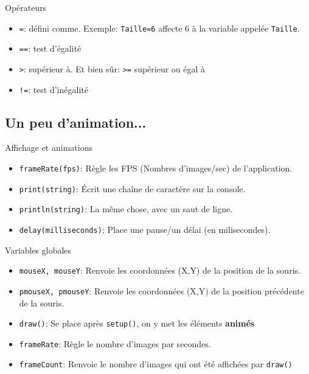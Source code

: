 \documentclass[a4paper, 8pt]{article}
\theoremstyle{definition}
\begin{document}


\begin{bclogo}[logo = \bccrayon, arrondi = 0.1, noborder = true]{\textcolor{redStruc}{Opérateurs}}
\begin{itemize}[font= \color{redStruc} \small , label = \textbullet ]
\item \texttt{=}: défini comme. Exemple: \texttt{Taille=6} affecte $6$ à la variable appelée \texttt{Taille}.
\item \texttt{==}: test d'égalité
\item  \texttt{>}: supérieur à. Et bien sûr: \texttt{>=} supérieur ou égal à
\item  \texttt{!=}: test d'inégalité
\end{itemize} 
\end{bclogo}




\subsection*{Un peu d'animation...}

\begin{bclogo}[logo = \bccrayon, arrondi = 0.1, noborder = true]{\textcolor{redStruc}{Affichage et animations}}
\begin{itemize}[font= \color{redStruc} \small , label = \textbullet ]
\item \texttt{frameRate(fps)}: Règle les FPS (Nombres d'images/sec) de l'application.
\item \texttt{print(string)}: Écrit une chaîne de caractère sur la console.
\item \texttt{println(string)}: La même chose, avec un saut de ligne.
\item \texttt{delay(milliseconds)}; Place une pause/un délai (en milisecondes).
\end{itemize}
\end{bclogo}




\begin{bclogo}[logo = \bccrayon, arrondi = 0.1, noborder = true]{\textcolor{redStruc}{Variables globales}}
\begin{itemize}[font= \color{redStruc} \small , label = \textbullet ]
\item \texttt{mouseX, mouseY}: Renvoie les coordonnées (X,Y) de la position de la souris.
\item \texttt{pmouseX, pmouseY}: Renvoie les coordonnées (X,Y) de la position précédente de la souris.
\item \texttt{draw()}: Se place après \texttt{setup()}, on y met les éléments \textbf{animés}
\item \texttt{frameRate}: Règle le nombre d'images par secondes.
\item \texttt{frameCount}: Renvoie le nombre d'images qui ont été affichées par \texttt{draw()}
\end{itemize} 
\end{bclogo}
\end{document}
